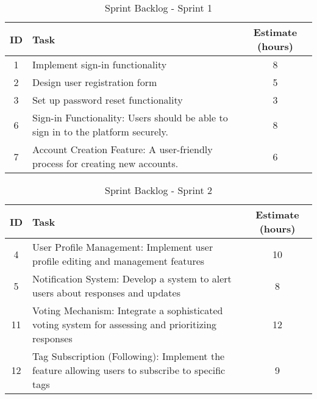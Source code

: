 \begin{table}[h]
    \centering
    \caption*{Sprint Backlog - Sprint 1}
    \begin{tabular}{|c|p{5cm}|c|}
        \hline
        \textbf{ID} & \textbf{Task} & \textbf{Estimate (hours)} \\
        \hline
        1 & Implement sign-in functionality & 8 \\
        \hline
        2 & Design user registration form & 5 \\
        \hline
        3 & Set up password reset functionality & 3 \\
        \hline
        6 & Sign-in Functionality: Users should be able to sign in to the platform securely. & 8 \\
        \hline
        7 & Account Creation Feature: A user-friendly process for creating new accounts. & 6 \\
        \hline
    \end{tabular}
\end{table}

\begin{table}[h]
    \centering
    \caption*{Sprint Backlog - Sprint 2}
    \begin{tabular}{|c|p{5cm}|c|}
        \hline
        \textbf{ID} & \textbf{Task} & \textbf{Estimate (hours)} \\
        \hline
        4 & User Profile Management: Implement user profile editing and management features & 10 \\
        \hline
        5 & Notification System: Develop a system to alert users about responses and updates & 8 \\
        \hline
        11 & Voting Mechanism: Integrate a sophisticated voting system for assessing and prioritizing responses & 12 \\
        \hline
        12 & Tag Subscription (Following): Implement the feature allowing users to subscribe to specific tags & 9 \\
        \hline
    \end{tabular}
\end{table}

